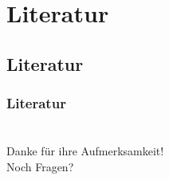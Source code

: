 \section{Literatur}
\subsection*{Literatur}
\begin{frame}[allowframebreaks]
  \frametitle{Literatur}
  \makebibliography
\end{frame}

\section*{}
{

  \begin{frame}
    \centering
    \LARGE
    Danke für ihre Aufmerksamkeit! \\[1.5cm]
    Noch Fragen?
  \end{frame}
}
